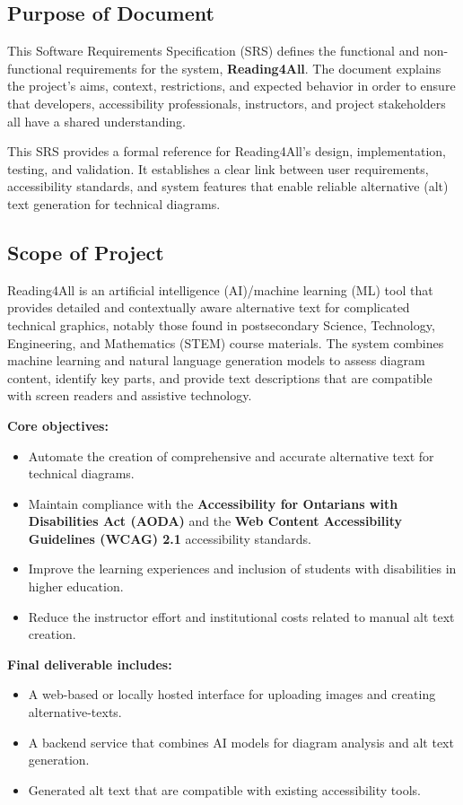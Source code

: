 \documentclass[12pt]{article}
\begin{document}
\subsection{Purpose of Document}
This Software Requirements Specification (SRS) defines the functional
and non-functional requirements for the \progname{} system,
\textbf{Reading4All}. The document explains the project's aims,
context, restrictions, and expected behavior in order to ensure that
developers, accessibility professionals, instructors, and project
stakeholders all have a shared understanding.

This SRS provides a formal reference for Reading4All's design,
implementation, testing, and validation. It establishes a clear link
between user requirements, accessibility standards, and system features that enable reliable alternative (alt) text
generation for technical diagrams.

\subsection{Scope of Project}
Reading4All is an artificial intelligence (AI)/machine learning (ML) tool that
provides detailed and contextually aware alternative text for
complicated technical graphics, notably those found in postsecondary
Science, Technology, Engineering, and Mathematics (STEM) course materials. The system combines machine learning and natural
language generation models to assess diagram content, identify key
parts, and provide text descriptions that are compatible with screen
readers and assistive technology.

\noindent \textbf{Core objectives:}
\begin{itemize}
  \item Automate the creation of comprehensive and accurate
    alternative text for technical diagrams.
  \item Maintain compliance with the \textbf{Accessibility for
    Ontarians with Disabilities Act (AODA)} and the \textbf{Web Content Accessibility Guidelines (WCAG) 2.1}
    accessibility standards.
  \item Improve the learning experiences and inclusion of students
    with disabilities in higher education.
  \item Reduce the instructor effort and institutional costs related
    to manual alt text creation.
\end{itemize}

\noindent \textbf{Final deliverable includes:}
\begin{itemize}
  \item A web-based or locally hosted interface for uploading images
    and creating alternative-texts.
  \item A backend service that combines AI models for diagram
    analysis and alt text generation.
  \item Generated alt text that are compatible with existing accessibility tools.
\end{itemize}
\end{document}

